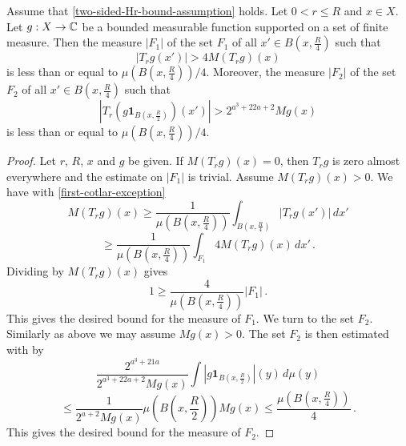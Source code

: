 \begin{lemma}
\label{Cotlar-sets}
\leanok
{}
Assume that \eqref{two-sided-Hr-bound-assumption} holds. Let $0<r\le R$ and  $x\in X$. Let $g:X\to\mathbb{C}$ be a bounded measurable function supported on a set of finite measure.
Then the measure $|F_1|$ of the set $F_1$ of all $x'\in B(x,\frac {R} 4)$ such that
\begin{equation}
\label{first-cotlar-exception}
    |T_rg(x')|> 4 M(T_rg)(x)
\end{equation}
is less than or equal to $\mu(B(x,\frac{R}{4}))/4$.
Moreover,  the measure $|F_2|$ of the set $F_2$ of all $x'\in
B(x,\frac {R} 4)$ such that
\begin{equation}
\label{second-cotlar-exception}
    |T_r(g\mathbf{1}_{B(x,\frac {R} 2)})(x')| > 2^{a^3 + 22a + 2} Mg(x)
\end{equation}
is less than or equal to  $\mu(B(x,\frac{R}{4}))/4$.
\end{lemma}

\begin{proof}
\leanok
Let $r$, $R$, $x$ and $g$ be given.
If $M(T_rg)(x)=0$, then $T_rg$ is zero almost everywhere and the estimate on $|F_1|$ is trivial.
Assume $M(T_rg)(x)>0$.
We have with \eqref{first-cotlar-exception}
\begin{equation}
    M(T_rg)(x)\ge
    \frac 1{\mu(B(x,\frac{R}{4}))}\int_{B(x,\frac{R}{4})}|T_rg(x')|\, dx'
\end{equation}
\begin{equation}
    \ge
    \frac 1{\mu(B(x,\frac{R}{4}))}\int_{F_1} 4 M(T_rg)(x)\, dx' \,.
\end{equation}
Dividing by $M(T_rg)(x)$ gives
\begin{equation}
    1\ge \frac{4}{\mu(B(x,\frac{R}{4}))} |F_1|\, .
\end{equation}
This gives the desired bound for the measure of $F_1$.
We turn to the set $F_2$. Similarly as above we may assume $Mg(x)>0$.
The set $F_2$ is then estimated with  by
\begin{equation}
   \frac {2^{a^3+21a}}{2^{a^3 + 22a + 2}Mg(x)}\int |g\mathbf{1}_{B(x,\frac {R}2)}|(y)\, d\mu(y)
\end{equation}
\begin{equation}
   \le \frac {1}{2^{a+2} Mg(x)}\mu(B(x,\frac {R}{2})) Mg(x) \le \frac{\mu(B(x,\frac {R}{4}))}{4} \,.
\end{equation}
This gives the desired bound for the measure of $F_2$.
\end{proof}

